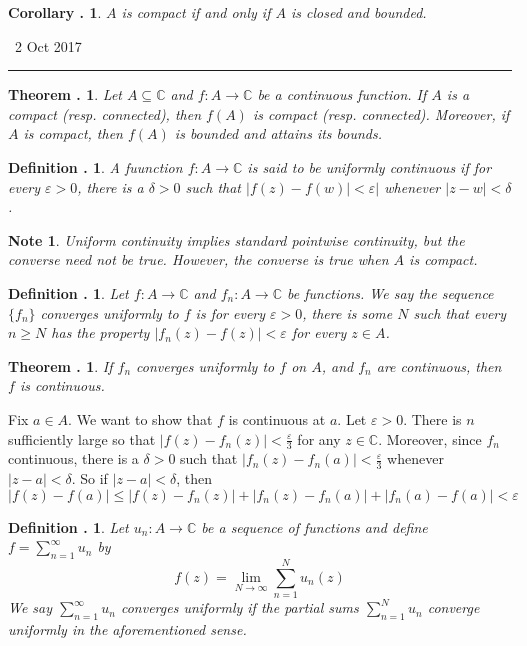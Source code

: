 \documentclass[twoside]{report}
\newcommand{\C}{\mathbb{C}}
\newcounter{Lecture}
\newcommand{\newLec}[1]{
  \stepcounter{Lecture}
  \noindent{\Large\bf Lecture \arabic{Lecture}} \, #1 \hfill  \rule[1ex]{2.5in}{.1pt} \vspace{1em}
}
\theoremstyle{myts}
\newcounter{c}[Lecture]
\newtheorem{dfn}[c]{Definition \arabic{Lecture}.}
\newtheorem{thm}[c]{Theorem \arabic{Lecture}.}
\newtheorem{cor}[c]{Corollary \arabic{Lecture}.}
\newtheorem*{nte}{Note}
\newcounter{ex}[Lecture]
\newenvironment{prf}{
  \noindent\begin{mdframed}[style=prf]}{\end{mdframed} \vspace{1em}
}
\begin{document}
\begin{cor}
  $A$ is compact if and only if $A$ is closed and bounded.
\end{cor}

\newLec{2 Oct 2017}

\begin{thm}
  Let \(A\subseteq\C\) and \( f : A \to \C \) be a continuous function. If $A$ is a compact (resp. connected), then \(f(A)\) is compact (resp. connected). Moreover, if $A$ is compact, then \(f(A)\)  is bounded and attains its bounds.
\end{thm}

\begin{dfn}
  A fuunction \( f: A\to \C\) is said to be \emph{uniformly continuous} if for every \(\varepsilon >0\), there is a \(\delta > 0 \) such that  \( |f(z) - f(w)| < \varepsilon | \) whenever \( | z-w | < \delta \).
\end{dfn}

\begin{nte}
  Uniform continuity implies standard pointwise continuity, but the converse need not be true. However, the converse is true when $A$ is compact.
\end{nte}

\begin{dfn}
  Let \( f: A\to\C \) and \( f_n: A\to\C \) be functions. We say the sequence \(\{f_n\}\) \emph{converges uniformly} to $f$ is for every \( \varepsilon > 0 \), there is some $N$ such that every \(n\geq N\) has the property \( |f_n(z) -f(z) | < \varepsilon \) for every \(z\in A\).
\end{dfn}

\begin{thm}
  If $f_n$ converges uniformly to $f$ on $A$, and $f_n$ are continuous, then $f$ is continuous.
\end{thm}

\begin{prf}
  Fix \( a\in A\). We want to show that $f$ is continuous at $a$. Let \(\varepsilon > 0 \). There is $n$ sufficiently large so that \( | f(z) - f_n(z) | < \frac{\varepsilon}{3} \) for any \( z\in \C \). Moreover, since $f_n$ continuous, there is a $\delta > 0$ such that \( | f_n(z) - f_n(a) | < \frac{\varepsilon}{3} \) whenever \( | z-a | < \delta \). So if \( |z-a| < \delta \), then
  \[
    |f(z) - f(a) | \leq |f(z) - f_n(z)| + |f_n(z) - f_n(a) | + | f_n(a) - f(a) | < \varepsilon
  \]
\end{prf}

\begin{dfn}
  Let \( u_n : A \to \C \) be a sequence of functions and define \( f = \sum_{n=1}^\infty u_n \) by
  \[
    f(z) = \lim_{N\to\infty} \sum_{n=1}^N u_n(z)
  \]
  We say \(\sum_{n=1}^\infty u_n \) \emph{converges uniformly} if the partial sums \( \sum_{n=1}^N u_n \)  converge uniformly in the aforementioned sense. 
\end{dfn}
\end{document}
